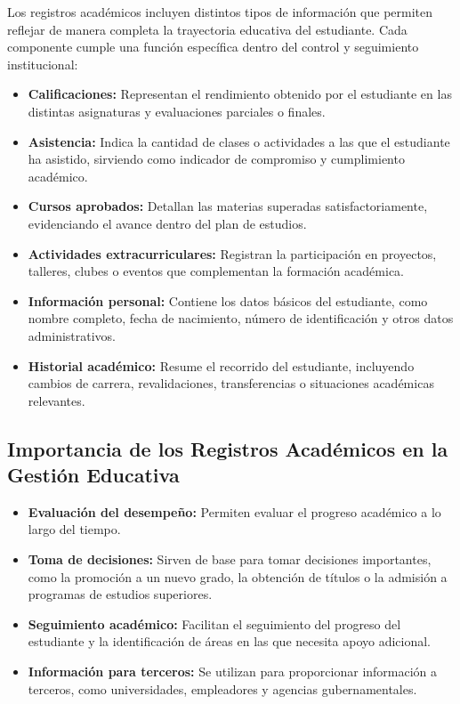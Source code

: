 Los registros académicos incluyen distintos tipos de información que permiten reflejar de manera completa la trayectoria educativa del estudiante. Cada componente cumple una función específica dentro del control y seguimiento institucional:

\begin{itemize}
  \item \textbf{Calificaciones:} Representan el rendimiento obtenido por el estudiante en las distintas asignaturas y evaluaciones parciales o finales.
  \item \textbf{Asistencia:} Indica la cantidad de clases o actividades a las que el estudiante ha asistido, sirviendo como indicador de compromiso y cumplimiento académico.
  \item \textbf{Cursos aprobados:} Detallan las materias superadas satisfactoriamente, evidenciando el avance dentro del plan de estudios.
  \item \textbf{Actividades extracurriculares:} Registran la participación en proyectos, talleres, clubes o eventos que complementan la formación académica.
  \item \textbf{Información personal:} Contiene los datos básicos del estudiante, como nombre completo, fecha de nacimiento, número de identificación y otros datos administrativos.
  \item \textbf{Historial académico:} Resume el recorrido del estudiante, incluyendo cambios de carrera, revalidaciones, transferencias o situaciones académicas relevantes.
\end{itemize}


\subsection{Importancia de los Registros Académicos en la Gestión Educativa}
\begin{itemize}
  \item \textbf{Evaluación del desempeño:} Permiten evaluar el progreso académico a lo largo del tiempo.
  \item \textbf{Toma de decisiones:} Sirven de base para tomar decisiones importantes, como la promoción a un nuevo grado, la obtención de títulos o la admisión a programas de estudios superiores.
  \item \textbf{Seguimiento académico:} Facilitan el seguimiento del progreso del estudiante y la identificación de áreas en las que necesita apoyo adicional.
  \item \textbf{Información para terceros:} Se utilizan para proporcionar información a terceros, como universidades, empleadores y agencias gubernamentales\cite{registroAsistenciaUTA}.
\end{itemize}

